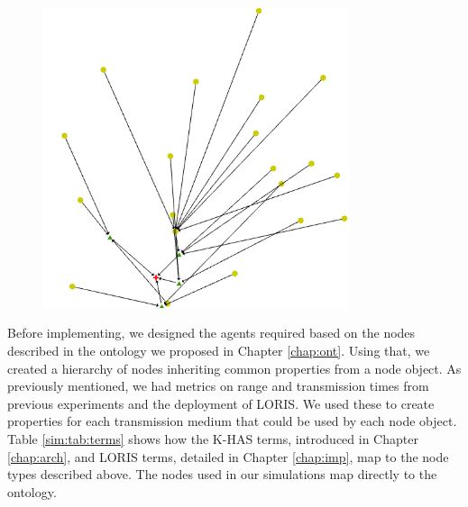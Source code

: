 	\DIFdelbegin %
\DIFdelend \DIFaddbegin \begin{figure}[h]
	\centering
	\includegraphics[width=0.8\textwidth]{Chap7/figures/khas_sim}
	\caption{}
	\label{fig:sim}
	\end{figure}
\DIFaddend 

Before implementing, we designed the agents required based on the nodes described in the ontology we proposed in Chapter \ref{chap:ont}. Using that, we created a hierarchy of nodes inheriting common properties from a node object. As previously mentioned, we had metrics on range and transmission times from previous experiments and the deployment of LORIS. We used these to create properties for each transmission medium that could be used by each node object. Table \ref{sim:tab:terms} shows how the K-HAS terms, introduced in Chapter \ref{chap:arch}, and LORIS terms, detailed in Chapter \ref{chap:imp}, map to the node types described above. The nodes used in our simulations map directly to the ontology.

